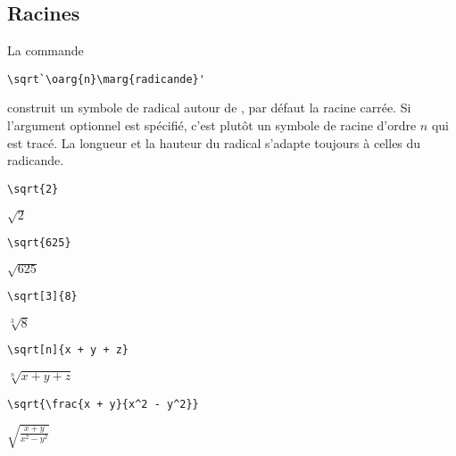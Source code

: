 
\subsection{Racines}
\label{sec:math:bases:racines}

La commande
\begin{lstlisting}
\sqrt`\oarg{n}\marg{radicande}'
\end{lstlisting}
construit un symbole de radical autour de , par défaut
la racine carrée. Si l'argument optionnel  est spécifié, c'est
plutôt un symbole de racine d'ordre $n$ qui est tracé. La longueur et
la hauteur du radical s'adapte toujours à celles du radicande.
\begin{demo}
  \begin{minipage}{0.3\linewidth}
    \begin{texample}[0.6\linewidth]
\begin{lstlisting}
\sqrt{2}
\end{lstlisting}
      \producing $\sqrt{2}$
    \end{texample}
  \end{minipage}
  \quad
  \begin{minipage}{0.3\linewidth}
    \begin{texample}[0.6\linewidth]
\begin{lstlisting}
\sqrt{625}
\end{lstlisting}
      \producing
      $\sqrt{625}$
    \end{texample}
  \end{minipage}
  \quad
  \begin{minipage}{0.3\linewidth}
    \begin{texample}[0.6\linewidth]
\begin{lstlisting}
\sqrt[3]{8}
\end{lstlisting}
      \producing
      $\sqrt[3]{8}$
    \end{texample}
  \end{minipage}

  \begin{texample}
\begin{lstlisting}
\sqrt[n]{x + y + z}
\end{lstlisting}
    \producing
    $\sqrt[n]{x + y + z}$
  \end{texample}

  \begin{texample}
\begin{lstlisting}
\sqrt{\frac{x + y}{x^2 - y^2}}
\end{lstlisting}
    \producing
    $\displaystyle \sqrt{\frac{x + y}{x^2 - y^2}}$
  \end{texample}
\end{demo}

